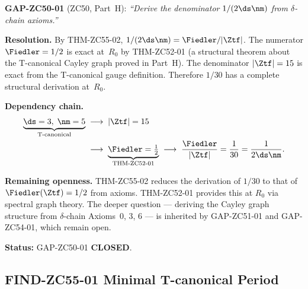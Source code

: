 \documentclass[12pt, a4paper]{article}
\begin{document}
\begin{formalbox}[title={COR-ZC55-02: GAP-ZC50-01 Closed ($R_0$)}]
\textbf{GAP-ZC50-01} (ZC50, Part~H):
\emph{``Derive the denominator $1/(2\ds\nm)$ from
$\delta$-chain axioms.''}

\medskip
\textbf{Resolution.}
By THM-ZC55-02, $1/(2\ds\nm)=\Fiedler/|\Ztf|$.  The numerator
$\Fiedler=1/2$ is exact at~$R_0$ by THM-ZC52-01 (a structural
theorem about the T-canonical Cayley graph proved in Part~H).
The denominator $|\Ztf|=15$ is exact from the T-canonical gauge
definition.  Therefore $1/30$ has a complete structural derivation
at~$R_0$.

\medskip
\textbf{Dependency chain.}
\begin{align*}
  \underbrace{\ds=3,\;\nm=5}_{\text{T-canonical}}
  &\;\longrightarrow\;|\Ztf|=15 \\
  &\;\longrightarrow\;\underbrace{\Fiedler=\tfrac{1}{2}}_{\text{THM-ZC52-01}}
  \;\longrightarrow\;
  \frac{\Fiedler}{|\Ztf|}=\frac{1}{30}=\frac{1}{2\ds\nm}.
\end{align*}

\textbf{Remaining openness.}
THM-ZC55-02 reduces the derivation of $1/30$ to that of
$\Fiedler(\Ztf)=1/2$ from axioms.  THM-ZC52-01 provides this at
$R_0$ via spectral graph theory.  The deeper question --- deriving
the Cayley graph structure from $\delta$-chain Axioms~0, 3, 6 ---
is inherited by GAP-ZC51-01 and GAP-ZC54-01, which remain open.

\medskip
\textbf{Status:} GAP-ZC50-01 \textbf{CLOSED}.
\end{formalbox}

\subsection{FIND-ZC55-01 \quad Minimal T-canonical Period}
\label{sec:find01}

\end{document}
